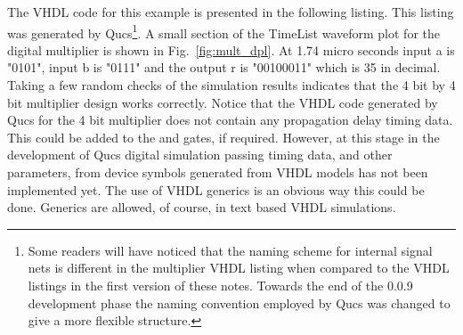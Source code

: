 The VHDL code for this example is presented in the following listing.
This listing was generated by Qucs\footnote{Some readers will have
noticed that the naming scheme for internal signal nets is different
in the multiplier VHDL listing when compared to the VHDL listings in
the first version of these notes. Towards the end of the 0.0.9
development phase the naming convention employed by Qucs was changed
to give a more flexible structure.}. A small section of the TimeList
waveform plot for the digital multiplier is shown in
Fig.~\ref{fig:mult_dpl}.  At 1.74 micro seconds input a is "0101",
input b is "0111" and the output r is "00100011" which is 35 in
decimal.  Taking a few random checks of the simulation results
indicates that the 4 bit by 4 bit multiplier design works correctly.
Notice that the VHDL code generated by Qucs for the 4 bit multiplier
does not contain any propagation delay timing data.  This could be
added to the and gates, if required.  However, at this stage in the
development of Qucs digital simulation passing timing data, and other
parameters, from device symbols generated from VHDL models has not
been implemented yet. The use of VHDL generics is an obvious way this
could be done. Generics are allowed, of course, in text based VHDL
simulations.

